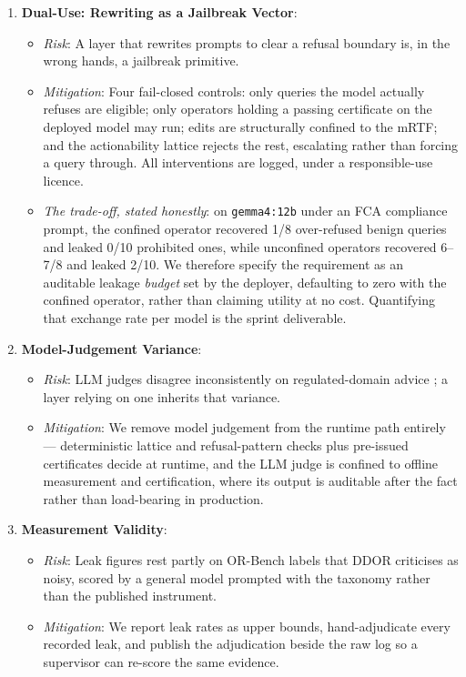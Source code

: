 \begin{enumerate}
    \item \textbf{Dual-Use: Rewriting as a Jailbreak Vector}:
    \begin{itemize}
        \item \textit{Risk}: A layer that rewrites prompts to clear a refusal
        boundary is, in the wrong hands, a jailbreak primitive.
        \item \textit{Mitigation}: Four fail-closed controls: only queries the
        model actually refuses are eligible; only operators holding a passing
        certificate on the deployed model may run; edits are structurally confined
        to the mRTF; and the actionability lattice rejects the rest, escalating
        rather than forcing a query through. All interventions are logged, under a
        responsible-use licence.
        \item \textit{The trade-off, stated honestly}: on \texttt{gemma4:12b}
        under an FCA compliance prompt, the confined operator recovered 1/8
        over-refused benign queries and leaked 0/10 prohibited ones, while
        unconfined operators recovered 6--7/8 and leaked 2/10. We therefore
        specify the requirement as an auditable leakage \emph{budget} set by the
        deployer, defaulting to zero with the confined operator, rather than
        claiming utility at no cost. Quantifying that exchange rate per model is
        the sprint deliverable.
    \end{itemize}
    \item \textbf{Model-Judgement Variance}:
    \begin{itemize}
        \item \textit{Risk}: LLM judges disagree inconsistently on regulated-domain
        advice \cite{llmjudges2026inconsistent}; a layer relying on one inherits
        that variance.
        \item \textit{Mitigation}: We remove model judgement from the runtime path
        entirely --- deterministic lattice and refusal-pattern checks plus
        pre-issued certificates decide at runtime, and the LLM judge is confined to
        offline measurement and certification, where its output is auditable after
        the fact rather than load-bearing in production.
    \end{itemize}
    \item \textbf{Measurement Validity}:
    \begin{itemize}
        \item \textit{Risk}: Leak figures rest partly on OR-Bench labels that DDOR
        \cite{zhou2026ddor} criticises as noisy, scored by a general model prompted
        with the taxonomy rather than the published instrument.
        \item \textit{Mitigation}: We report leak rates as upper bounds,
        hand-adjudicate every recorded leak, and publish the adjudication beside
        the raw log so a supervisor can re-score the same evidence.
    \end{itemize}
\end{enumerate}

